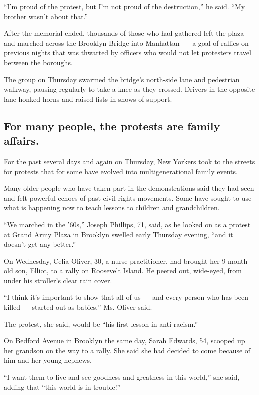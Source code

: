 ``I'm proud of the protest, but I'm not proud of the destruction,'' he
said. ``My brother wasn't about that.''

After the memorial ended, thousands of those who had gathered left the
plaza and marched across the Brooklyn Bridge into Manhattan ---~a goal
of rallies on previous nights that was thwarted by officers who would
not let protesters travel between the boroughs.

The group on Thursday swarmed the bridge's north-side lane and
pedestrian walkway, pausing regularly to take a knee as they crossed.
Drivers in the opposite lane honked horns and raised fists in shows of
support.

\hypertarget{for-many-people-the-protests-are-family-affairs}{%
\subsection{For many people, the protests are family
affairs.}\label{for-many-people-the-protests-are-family-affairs}}

For the past several days and again on Thursday, New Yorkers took to the
streets for protests that for some have evolved into multigenerational
family events.

Many older people who have taken part in the demonstrations said they
had seen and felt powerful echoes of past civil rights movements. Some
have sought to use what is happening now to teach lessons to children
and grandchildren.

``We marched in the '60s,'' Joseph Phillips, 71, said, as he looked on
as a protest at Grand Army Plaza in Brooklyn swelled early Thursday
evening, ``and it doesn't get any better.''

On Wednesday, Celia Oliver, 30, a nurse practitioner, had brought her
9-month-old son, Elliot, to a rally on Roosevelt Island. He peered out,
wide-eyed, from under his stroller's clear rain cover.

``I think it's important to show that all of us --- and every person who
has been killed --- started out as babies,'' Ms. Oliver said.

The protest, she said, would be ``his first lesson in anti-racism.''

On Bedford Avenue in Brooklyn the same day, Sarah Edwards, 54, scooped
up her grandson on the way to a rally. She said she had decided to come
because of him and her young nephews.

``I want them to live and see goodness and greatness in this world,''
she said, adding that ``this world is in trouble!''

